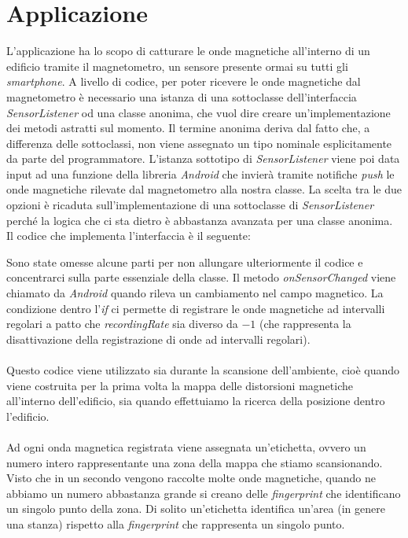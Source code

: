 \section{Applicazione}
L'applicazione ha lo scopo di catturare le onde magnetiche all'interno di un edificio tramite il magnetometro, un sensore presente ormai su tutti gli \textit{smartphone}. A livello di codice, per poter ricevere le onde magnetiche dal magnetometro \`e necessario una istanza di una sottoclasse dell'interfaccia \textit{SensorListener} od una classe anonima, che vuol dire creare un'implementazione dei metodi astratti sul momento. Il termine anonima deriva dal fatto che, a differenza delle sottoclassi, non viene assegnato un tipo nominale esplicitamente da parte del programmatore. L'istanza sottotipo di \textit{SensorListener} viene poi data input ad una funzione della libreria \textit{Android} che invier\`a  tramite notifiche \textit{push} le onde magnetiche rilevate dal magnetometro alla nostra classe. La scelta tra le due opzioni \`e ricaduta sull'implementazione di una sottoclasse di \textit{SensorListener} perch\'e la logica che ci sta dietro \`e abbastanza avanzata per una classe anonima. Il codice che implementa l'interfaccia  \`e il seguente:

Sono state omesse alcune parti per non allungare ulteriormente il codice e concentrarci sulla parte essenziale della classe. Il metodo \textit{onSensorChanged} viene chiamato da \textit{Android} quando rileva un cambiamento nel campo magnetico. La condizione dentro l'\textit{if} ci permette di registrare le onde magnetiche ad intervalli regolari a patto che \textit{recordingRate} sia diverso da $-1$ (che rappresenta la  disattivazione della registrazione di onde ad intervalli regolari).
\\\\
Questo codice viene utilizzato sia durante la scansione dell'ambiente, cio\`e quando viene costruita per la prima volta la mappa delle distorsioni magnetiche all'interno dell'edificio, sia quando effettuiamo la ricerca della posizione dentro l'edificio.
\\\\
Ad ogni onda magnetica registrata viene assegnata un'etichetta, ovvero un numero intero rappresentante una zona della mappa che stiamo scansionando. Visto che in un secondo vengono raccolte molte onde magnetiche, quando ne abbiamo un numero abbastanza grande si creano delle \textit{fingerprint} che identificano un singolo punto della zona. Di solito un'etichetta identifica un'area (in genere una stanza) rispetto alla \textit{fingerprint} che rappresenta un singolo punto.
